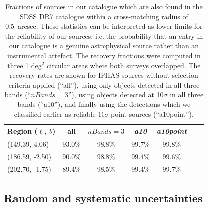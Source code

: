 \documentclass[a4paper,useAMS,usenatbib]{mn2e}
\begin{document}
{\begin{table}
    \caption{Fractions of sources in our catalogue
             which are also found in the SDSS DR7 catalogue
             within a cross-matching radius of 0.5~arcsec.
             These statistics can be interpreted
             as lower limits
             for the reliability of our sources,
             i.e. the probability that an entry in our
             catalogue is a genuine astrophysical source
             rather than an instrumental artefact.
             The recovery fractions were computed
             in three 1 deg$^2$ circular areas
             where both surveys overlapped.
             The recovery rates are shown
             for IPHAS sources 
             without selection criteria applied (``all''),
             using only objects detected in all three bands (``$nBands=3$''),
             using objects detected at 10$\sigma$
             in all three bands (``a10''),
             and finally using the detections
             which we classified earlier
             as reliable 10$\sigma$ point sources (``a10point'').
             }
    \label{tbl:reliability}
    \begin{center}
        \begin{tabular}{lcccccc}
        \toprule
        Region ($\ell$, $b$) & all & $nBands=3$ & \emph{a10} & \emph{a10point} \\
        \midrule
        (149.39, 4.06) & 93.0\% & 98.8\% & 99.7\% & 99.8\% \\
        (186.59, -2.50) & 90.0\% & 98.8\% & 99.4\% & 99.6\% \\
        (202.70, -1.75) & 89.4\% & 98.5\% &99.4\% & 99.7\% \\
        \bottomrule
        \end{tabular}
    \end{center}
\end{table}

}

\subsection{Random and systematic uncertainties}
\label{sec:uncertainties}
\end{document}
